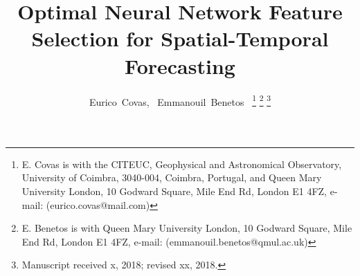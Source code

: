 \documentclass[journal]{IEEEtran}
\begin{document}

%
\title{Optimal Neural Network Feature Selection for Spatial-Temporal Forecasting}
%
%
%



\author{Eurico~Covas,~\IEEEmembership{}
	    Emmanouil~Benetos~\IEEEmembership{}%
\thanks{E. Covas is with the CITEUC, Geophysical and Astronomical Observatory, University of Coimbra, 3040-004, Coimbra, Portugal, and
Queen Mary University London, 10 Godward Square, Mile End Rd, London E1 4FZ,  e-mail: (eurico.covas@mail.com)}%
\thanks{E. Benetos is with Queen Mary University London, 10 Godward Square, Mile End Rd, London E1 4FZ,
e-mail: (emmanouil.benetos@qmul.ac.uk)}%
\thanks{Manuscript received x, 2018; revised xx, 2018.}}
\end{document}
